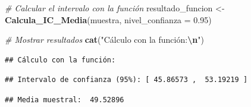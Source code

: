 \documentclass[
]{article}
\newenvironment{Shaded}{\begin{snugshade}}{\end{snugshade}}
\newcommand{\AttributeTok}[1]{\textcolor[rgb]{0.13,0.29,0.53}{#1}}
\newcommand{\CommentTok}[1]{\textcolor[rgb]{0.56,0.35,0.01}{\textit{#1}}}
\newcommand{\FloatTok}[1]{\textcolor[rgb]{0.00,0.00,0.81}{#1}}
\newcommand{\FunctionTok}[1]{\textcolor[rgb]{0.13,0.29,0.53}{\textbf{#1}}}
\newcommand{\NormalTok}[1]{#1}
\newcommand{\OtherTok}[1]{\textcolor[rgb]{0.56,0.35,0.01}{#1}}
\newcommand{\SpecialCharTok}[1]{\textcolor[rgb]{0.81,0.36,0.00}{\textbf{#1}}}
\newcommand{\StringTok}[1]{\textcolor[rgb]{0.31,0.60,0.02}{#1}}
\begin{document}
\begin{Shaded}
\begin{Highlighting}[]
\CommentTok{\# Calcular el intervalo con la función}
\NormalTok{resultado\_funcion }\OtherTok{\textless{}{-}} \FunctionTok{Calcula\_IC\_Media}\NormalTok{(muestra, }\AttributeTok{nivel\_confianza =} \FloatTok{0.95}\NormalTok{)}

\CommentTok{\# Mostrar resultados}
\FunctionTok{cat}\NormalTok{(}\StringTok{"Cálculo con la función:}\SpecialCharTok{\textbackslash{}n}\StringTok{"}\NormalTok{)}
\end{Highlighting}
\end{Shaded}

\begin{verbatim}
## Cálculo con la función:
\end{verbatim}

\begin{Shaded}
\end{Shaded}

\begin{verbatim}
## Intervalo de confianza (95%): [ 45.86573 ,  53.19219 ]
\end{verbatim}

\begin{Shaded}
\end{Shaded}

\begin{verbatim}
## Media muestral:  49.52896
\end{verbatim}

\begin{Shaded}
\end{Shaded}
\end{document}
